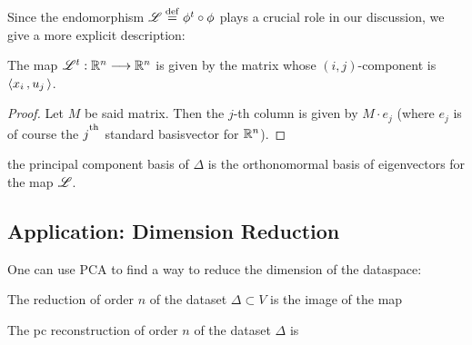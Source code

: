 Since the endomorphism $\r{L}\define \phi^t\circ \phi$ plays a crucial role in our discussion, we give a more explicit description:

\begin{lemma}
The map $\r{L}^t: \d{R}^n\mor \d{R}^n$ is given by the matrix whose $(i,j)$-component is $\left\langle x_i\,,u_j\, \right\rangle$.
\end{lemma}

\begin{proof}
Let $M$ be said matrix. Then the $j$-th column is given by $M \cdot e_j$ (where $e_j$ is of course the $j^\textsuperscript{th}$ standard basisvector for $\mathbb{R}^n$). 	
\end{proof}

\begin{definition}
\label{definition:principal_component_basis}
the principal component basis of $\Delta$ is the orthonomormal basis of eigenvectors for the map $\r{L}$.
\end{definition}

\subsection{Application: Dimension Reduction}
\label{subsection:application-dimension_reduction}


One can use PCA to find a way to reduce the dimension of the dataspace:



\begin{definition}
\label{definition:pc_dimension_reduction}
The reduction of order $n$ of the dataset $\Delta \subset V$ is the image of the map
\end{definition}

\begin{definition}
\label{definition:pc_recontruction}
The pc reconstruction of order $n$ of the dataset $\Delta$ is 
\end{definition}





